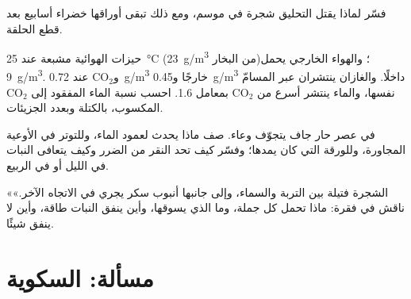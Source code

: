 \begin{exercise}[$\star\star$]\label{exo:b1:plant-transport:9}
فسّر لماذا يقتل التحليق شجرة في موسم، ومع ذلك تبقى أوراقها خضراء
أسابيع بعد قطع الحلقة.
\end{exercise}

\begin{exercise}[$\star\star\star$]\label{exo:b1:plant-transport:10}
حيزات  الهوائية مشبعة عند \qty{25}{\celsius}
(\qty{23}{g/m^3} من البخار)؛ والهواء الخارجي يحمل \qty{9}{g/m^3}.
و$\mathrm{CO_2}$ عند \qty{0.72}{g/m^3} خارجًا و\qty{0.45}{g/m^3}
داخلًا. والغازان ينتشران عبر المسامّ نفسها، والماء ينتشر أسرع من
$\mathrm{CO_2}$ بمعامل 1.6. احسب نسبة الماء المفقود إلى
$\mathrm{CO_2}$ المكسوب، بالكتلة وبعدد الجزيئات.
\end{exercise}

\begin{exercise}[$\star\star\star$]\label{exo:b1:plant-transport:11}
في عصر حار جاف يتجوّف وعاء. صف ماذا يحدث لعمود الماء، وللتوتر في
الأوعية المجاورة، وللورقة التي كان يمدها؛ وفسّر كيف تحد النقر من
الضرر وكيف يتعافى النبات في الليل أو في الربيع.
\end{exercise}

\begin{exercise}[$\star\star\star$]\label{exo:b1:plant-transport:12}
«الشجرة فتيلة بين التربة والسماء، وإلى جانبها أنبوب سكر يجري في
الاتجاه الآخر.» ناقش في فقرة: ماذا تحمل كل جملة، وما الذي يسوقها،
وأين ينفق النبات طاقة، وأين لا ينفق شيئًا.
\end{exercise}

\section{مسألة: السكوية}

